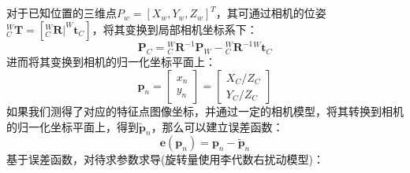 \documentclass[12pt, onecolumn]{article}
\title{\normf{这是标题}}
\author{\normf{陈烁龙}}
\date{\normf{\today}}
\newcommand{\normf}{\kaishu}
\begin{document}
	
	\maketitle
	\thispagestyle{empty}
	\clearpage
	
	\tableofcontents
	\listoffigures
	\listoftables
	\setcounter{page}{1}
	\clearpage
	\setcounter{page}{1}
	
	
	\section{\normf{PnP描述}}
	\normf
	对于已知位置的三维点$P_w=\left[ X_w,Y_w,Z_w \right]^T $，其可通过相机的位姿${^{W}_{C}\boldsymbol{T}=\left[ {^{W}_{C}\boldsymbol{R}} |^{W}\boldsymbol{t}_C \right]}$，将其变换到局部相机坐标系下：
	\begin{equation*}
	\boldsymbol{P}_C={^{W}_{C}\boldsymbol{R}^{-1}}\boldsymbol{P}_W-{^{W}_{C}\boldsymbol{R}^{-1}}{^{W}\boldsymbol{t}_C}
	\end{equation*}
	进而将其变换到相机的归一化坐标平面上：
	\begin{equation*}
	\boldsymbol{p}_n=\begin{bmatrix}
	x_n\\y_n
	\end{bmatrix}=\begin{bmatrix}
	X_C/Z_C\\Y_C/Z_C
	\end{bmatrix}
	\end{equation*}
	如果我们测得了对应的特征点图像坐标，并通过一定的相机模型，将其转换到相机的归一化坐标平面上，得到$\boldsymbol{\tilde{p}}_n$，那么可以建立误差函数：
	\begin{equation*}
		\boldsymbol{e}(\boldsymbol{p}_n)=\boldsymbol{p}_n-\boldsymbol{\tilde{p}}_n
	\end{equation*}
	基于误差函数，对待求参数求导(旋转量使用李代数右扰动模型)：
\end{document}
